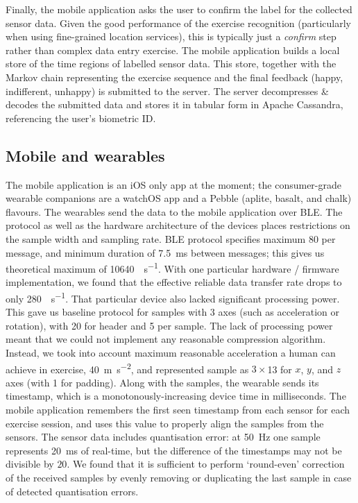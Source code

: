 \documentclass[a4paper, 10 pt, conference]{IEEEtran}
\begin{document}
Finally, the mobile application asks the user to confirm the label for the collected sensor data. Given the good performance of the exercise recognition (particularly when using fine-grained location services), this is typically just a \emph{confirm} step rather than complex data entry exercise. The mobile application builds a local store of the time regions of labelled sensor data. This store, together with the Markov chain representing the exercise sequence and the final feedback (happy, indifferent, unhappy) is submitted to the server. The server decompresses \& decodes the submitted data and stores it in tabular form in Apache Cassandra, referencing the user's biometric ID. 

\subsection{Mobile and wearables}

The mobile application is an iOS only app at the moment; the consumer-grade wearable companions are a watchOS app and a Pebble (aplite, basalt, and chalk) flavours. The wearables send the data to the mobile application over BLE. The protocol as well as the hardware architecture of the devices places restrictions on the sample width and sampling rate. BLE protocol specifies maximum \SI{80}{\byte} per message, and minimum duration of \SI{7.5}{\milli\second} between messages; this gives us theoretical maximum of \SI{10640}{\byte\per\second}. With one particular hardware / firmware implementation, we found that the effective reliable data transfer rate drops to only \SI{280}{\byte\per\second}. That particular device also lacked significant processing power. This gave us baseline protocol for samples with 3 axes (such as acceleration or rotation), with \SI{20}{\byte} for header and \SI{5}{\byte} per sample. The lack of processing power meant that we could not implement any reasonable compression algorithm. Instead, we took into account maximum reasonable acceleration a human can achieve in exercise, \SI{40}{\meter\second^{-2}}, and represented sample as $3 \times$\SI{13}{\bit} for $x$, $y$, and $z$ axes (with \SI{1}{\bit} for padding). Along with the samples, the wearable sends its timestamp, which is a monotonously-increasing device time in milliseconds. The mobile application remembers the first seen timestamp from each sensor for each exercise session, and uses this value to properly align the samples from the sensors. The sensor data includes quantisation error: at \SI{50}{\hertz} one sample represents \SI{20}{\milli\second} of real-time, but the difference of the timestamps may not be divisible by $20$. We found that it is sufficient to perform `round-even' correction of the received samples by evenly removing or duplicating the last sample in case of detected quantisation errors.
\end{document}
